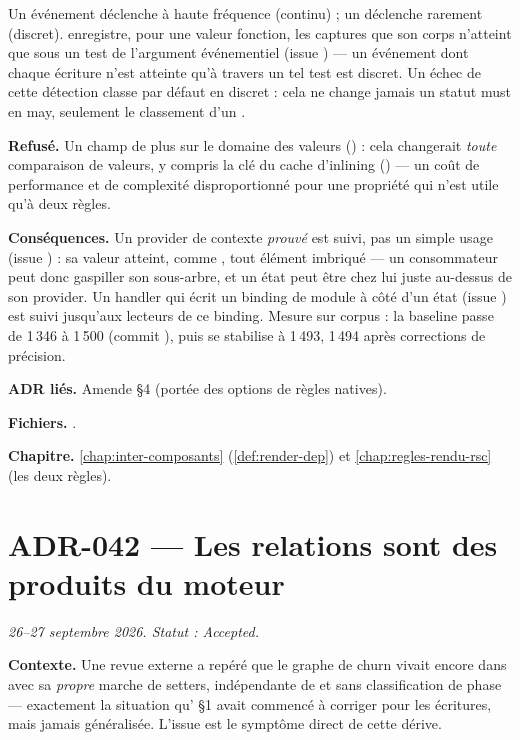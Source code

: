 \begin{react}
Un événement  déclenche à haute fréquence (continu) ; un
 déclenche rarement (discret).  enregistre,
pour une valeur fonction, les captures que son corps n'atteint que sous un
test de l'argument événementiel (issue ) --- un événement dont
chaque écriture n'est atteinte qu'à travers un tel test est discret. Un
échec de cette détection classe par défaut en discret : cela ne change jamais
un statut must en may, seulement le classement d'un \Warning{}.
\end{react}

\textbf{Refusé.} Un champ de plus sur le domaine des valeurs
() : cela changerait \emph{toute} comparaison de valeurs,
y compris la clé du cache d'inlining () --- un coût de
performance et de complexité disproportionné pour une propriété qui n'est
utile qu'à deux règles.

\textbf{Conséquences.} Un provider de contexte \emph{prouvé} est suivi, pas un
simple usage (issue ) : sa valeur atteint, comme
, tout élément imbriqué --- un consommateur peut donc
gaspiller son sous-arbre, et un état peut être \og chez lui\fg{} juste
au-dessus de son provider. Un handler qui écrit un binding de module à côté
d'un état (issue ) est suivi jusqu'aux lecteurs de ce binding.
Mesure sur corpus : la baseline passe de 1\,346 à 1\,500 (commit
), puis se stabilise à 1\,493, 1\,494 après corrections de
précision.

\textbf{ADR liés.} Amende  §4 (portée des options de règles natives).

\textbf{Fichiers.} .

\textbf{Chapitre.} \cref{chap:inter-composants} (\cref{def:render-dep}) et
\cref{chap:regles-rendu-rsc} (les deux règles).

\section{ADR-042 --- Les relations sont des produits du moteur}
\label{adr:42}
\noindent\textit{26--27 septembre 2026. Statut : Accepted.}

\textbf{Contexte.} Une revue externe a repéré que le graphe de churn vivait
encore dans  avec sa \emph{propre} marche de setters,
indépendante de  et sans classification de phase
--- exactement la situation qu' §1 avait commencé à corriger pour les
écritures, mais jamais généralisée. L'issue  est le symptôme direct
de cette dérive.

